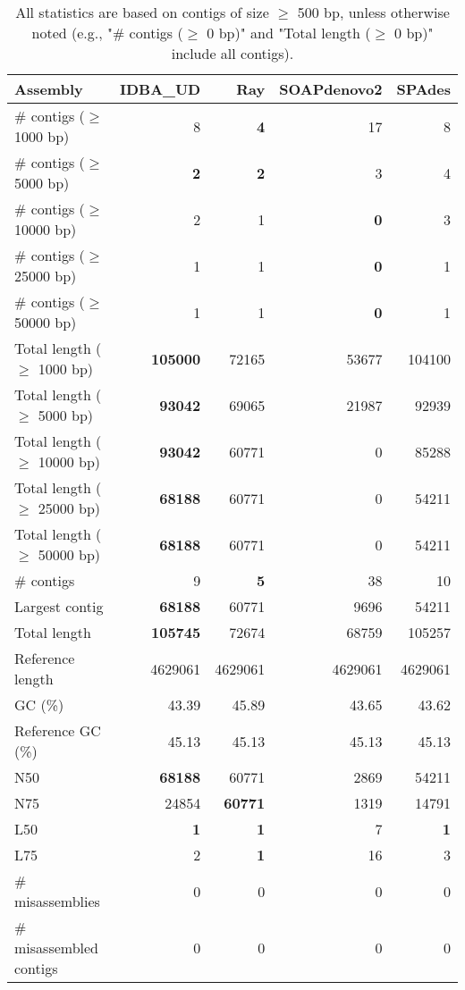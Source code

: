 \documentclass[12pt,a4paper]{article}
\begin{document}
\begin{table}[ht]
\begin{center}
\caption{All statistics are based on contigs of size $\geq$ 500 bp, unless otherwise noted (e.g., "\# contigs ($\geq$ 0 bp)" and "Total length ($\geq$ 0 bp)" include all contigs).}
\begin{tabular}{|l*{4}{|r}|}
\hline
Assembly & IDBA\_UD & Ray & SOAPdenovo2 & SPAdes \\ \hline
\# contigs ($\geq$ 1000 bp) & 8 & {\bf 4} & 17 & 8 \\ \hline
\# contigs ($\geq$ 5000 bp) & {\bf 2} & {\bf 2} & 3 & 4 \\ \hline
\# contigs ($\geq$ 10000 bp) & 2 & 1 & {\bf 0} & 3 \\ \hline
\# contigs ($\geq$ 25000 bp) & 1 & 1 & {\bf 0} & 1 \\ \hline
\# contigs ($\geq$ 50000 bp) & 1 & 1 & {\bf 0} & 1 \\ \hline
Total length ($\geq$ 1000 bp) & {\bf 105000} & 72165 & 53677 & 104100 \\ \hline
Total length ($\geq$ 5000 bp) & {\bf 93042} & 69065 & 21987 & 92939 \\ \hline
Total length ($\geq$ 10000 bp) & {\bf 93042} & 60771 & 0 & 85288 \\ \hline
Total length ($\geq$ 25000 bp) & {\bf 68188} & 60771 & 0 & 54211 \\ \hline
Total length ($\geq$ 50000 bp) & {\bf 68188} & 60771 & 0 & 54211 \\ \hline
\# contigs & 9 & {\bf 5} & 38 & 10 \\ \hline
Largest contig & {\bf 68188} & 60771 & 9696 & 54211 \\ \hline
Total length & {\bf 105745} & 72674 & 68759 & 105257 \\ \hline
Reference length & 4629061 & 4629061 & 4629061 & 4629061 \\ \hline
GC (\%) & 43.39 & 45.89 & 43.65 & 43.62 \\ \hline
Reference GC (\%) & 45.13 & 45.13 & 45.13 & 45.13 \\ \hline
N50 & {\bf 68188} & 60771 & 2869 & 54211 \\ \hline
N75 & 24854 & {\bf 60771} & 1319 & 14791 \\ \hline
L50 & {\bf 1} & {\bf 1} & 7 & {\bf 1} \\ \hline
L75 & 2 & {\bf 1} & 16 & 3 \\ \hline
\# misassemblies & 0 & 0 & 0 & 0 \\ \hline
\# misassembled contigs & 0 & 0 & 0 & 0 \\ \hline

\end{tabular}
\end{center}
\end{table}
\end{document}

